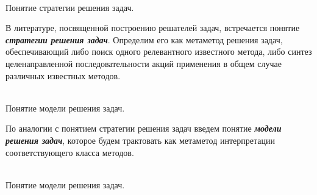
	

	

\begin{frame}{\\Понятие стратегии решения задач.}
	\topline
	\justifying
    \begin{SCn}
    В литературе, посвященной построению решателей задач, встречается понятие \textbf{\textit{стратегии решения задач}}. Определим его как метаметод решения задач, обеспечивающий либо поиск одного релевантного известного метода, либо синтез целенаправленной последовательности акций применения в общем случае различных известных методов. 
    \end{SCn}
\end{frame}

\begin{frame}{\\Понятие модели решения задач.}
	\topline
	\justifying
    \begin{SCn}
    \vspace{0.33cm}
    
    По аналогии с понятием стратегии решения задач введем понятие \textbf{\textit{модели решения задач}}, которое будем трактовать как метаметод интерпретации соответствующего класса методов.
    \end{SCn}
\end{frame}

\begin{frame}{\\Понятие модели решения задач.}
	\topline
	\justifying
    \begin{SCn}
    \end{SCn}
\end{frame}

